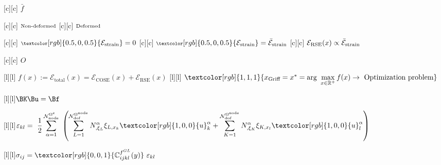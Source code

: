 [c][c] {$\bar{f}$}

[c][c] {$\scriptsize \text{Non-deformed}$}
[c][c] {$\scriptsize \text{Deformed}$}

[c][c] {$\scriptsize \textcolor[rgb]{0.5,0,0.5}{\mathcal{E}_{\text{strain}}} = 0$}
[c][c] {$\scriptsize \textcolor[rgb]{0.5,0,0.5}{\mathcal{E}_{\text{strain}}} = \bar{\mathcal{E}}_{\text{strain}}$}
[c][c] {$\scriptsize \mathcal{E}_{\text{RSE}}(x) \propto \bar{\mathcal{E}}_{\text{strain}}$}

[c][c] {$O$}

[l][l] {$f(x):= \mathcal{E}_{\text{total}}(x) = \mathcal{E}_{\text{COSE}}(x) + \mathcal{E}_{\text{RSE}}(x)$}
[l][l] {$\textcolor[rgb]{1,1,1}{x_{\text{Griff}} = x^* = \arg \displaystyle\ \max_{x\in \mathbb{R}^{+}} f(x) \rightarrow \ \text{Optimization problem}}$}

[l][l]{$\displaystyle \BK\Bu = \Bf
	$}

[l][l]{$\displaystyle
	\varepsilon_{kl} = \
	\frac{1}{2} \sum_{\alpha=1}^{\mathcal{N}_{\text{node}}^{\Omega^{e}}} \
	\left( \sum_{L=1}^{\mathcal{N}_{\text{dof}}^{\Omega^{\text{node}}}} N^{\alpha}_{,\xi_{L}}\xi_{L,x_{k}} \textcolor[rgb]{1,0,0}{u}_{k}^{\alpha}
	+\sum_{K=1}^{\mathcal{N}_{\text{dof}}^{\Omega^{\text{node}}}} N^{\alpha}_{,\xi_{K}}\xi_{K,x_{l}} \textcolor[rgb]{1,0,0}{u}_{l}^{\alpha} \right)$}

\psfrag{fest}[l][l]{$\displaystyle \sigma_{ij} = \textcolor[rgb]{0,0,1}{\mathbb{C}_{ijkl}^{f^{GL}}(y)}\ \varepsilon_{kl} $}

